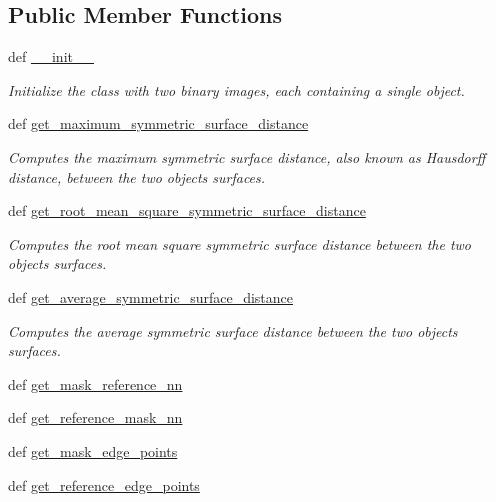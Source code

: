 \subsection*{Public Member Functions}
\begin{DoxyCompactItemize}
\item 
def \hyperlink{classmedpy_1_1metric_1_1surface_1_1Surface_a46994eacbac664bc6d33d19bac6f7b2c}{\_\-\_\-init\_\-\_\-}
\begin{DoxyCompactList}\small\item\em Initialize the class with two binary images, each containing a single object. \end{DoxyCompactList}\item 
def \hyperlink{classmedpy_1_1metric_1_1surface_1_1Surface_a8684d8c1382318e6bf319b668c81dd1a}{get\_\-maximum\_\-symmetric\_\-surface\_\-distance}
\begin{DoxyCompactList}\small\item\em Computes the maximum symmetric surface distance, also known as Hausdorff distance, between the two objects surfaces. \end{DoxyCompactList}\item 
def \hyperlink{classmedpy_1_1metric_1_1surface_1_1Surface_a920a84703f013d3c30b9a29e352700d9}{get\_\-root\_\-mean\_\-square\_\-symmetric\_\-surface\_\-distance}
\begin{DoxyCompactList}\small\item\em Computes the root mean square symmetric surface distance between the two objects surfaces. \end{DoxyCompactList}\item 
def \hyperlink{classmedpy_1_1metric_1_1surface_1_1Surface_a1f0c6c294baebf0ca8f45c47697e6410}{get\_\-average\_\-symmetric\_\-surface\_\-distance}
\begin{DoxyCompactList}\small\item\em Computes the average symmetric surface distance between the two objects surfaces. \end{DoxyCompactList}\item 
def \hyperlink{classmedpy_1_1metric_1_1surface_1_1Surface_a24fed896ac83b61f7abd9719ebe8ff6f}{get\_\-mask\_\-reference\_\-nn}
\item 
def \hyperlink{classmedpy_1_1metric_1_1surface_1_1Surface_abbd8cea3e3dd7a4a9c1af123e889e7bb}{get\_\-reference\_\-mask\_\-nn}
\item 
def \hyperlink{classmedpy_1_1metric_1_1surface_1_1Surface_adf21c517a7f9cfc187546e2c2db99409}{get\_\-mask\_\-edge\_\-points}
\item 
def \hyperlink{classmedpy_1_1metric_1_1surface_1_1Surface_abee40ce81906de3f356a08019985be24}{get\_\-reference\_\-edge\_\-points}
\end{DoxyCompactItemize}
